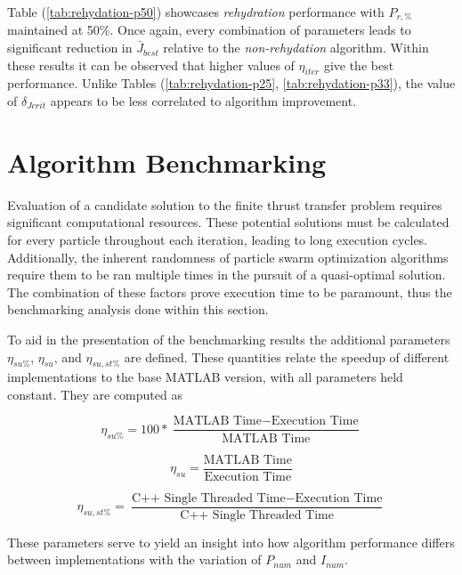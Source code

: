 \noindent Table (\ref{tab:rehydation-p50}) showcases \textit{rehydration} performance with 
$P_{r,\text{\%}}$ maintained at 50\%. Once again, every combination of parameters leads to 
significant reduction in $\bar{J}_{best}$ relative to the \textit{non-rehydation} algorithm. 
Within these results it can be observed that higher values of
$\eta_{iter}$ give the best performance. Unlike Tables (\ref{tab:rehydation-p25}, \ref{tab:rehydation-p33}), 
the value of $\delta_{Jcrit}$ appears to be less correlated to algorithm improvement.

\section{Algorithm Benchmarking}

\noindent Evaluation of a candidate solution to the finite thrust transfer problem requires significant computational resources.
These potential solutions must be calculated for every particle throughout each iteration, leading to long execution cycles.
Additionally, the inherent randomness of particle swarm optimization algorithms require them to be ran multiple times in the
pursuit of a quasi-optimal solution. The combination of these factors prove execution time to be paramount, thus the benchmarking
analysis done within this section. \newline

\noindent To aid in the presentation of the benchmarking results the additional parameters $\eta_{su\%}$, $\eta_{su}$, and $\eta_{su,st\%}$ are defined. 
These quantities relate the speedup of different implementations to the base MATLAB version, with all parameters held constant. 
They are computed as

\begin{equation}
\eta_{su\%} = 100*\frac{\text{MATLAB Time} - \text{Execution Time}}{\text{MATLAB Time}}
\label{eq:etaSUpercent}
\end{equation}


\begin{equation}
  \eta_{su} = \frac{\text{MATLAB Time}}{\text{Execution Time}}
  \label{eq:etaSU}
  \end{equation}


\begin{equation}
  \eta_{su,st\%} = \frac{\text{C++ Single Threaded Time} - \text{Execution Time}}{\text{C++ Single Threaded Time}}
  \label{eq:etaSUSTpercent}
  \end{equation}

\noindent These parameters serve to yield an insight into how algorithm performance differs between implementations
with the variation of $P_{num}$ and $I_{num}$.

